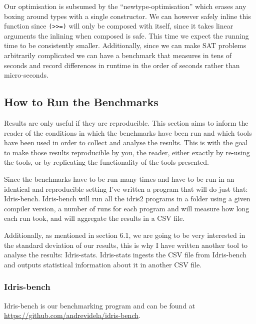 \documentclass[
]{article}
\begin{document}
Our optimisation is subsumed by the ``newtype-optimisation'' which
erases any boxing around types with a single constructor. We can however
safely inline this function since
\texttt{(\textgreater{}\textgreater{}=)} will only be composed with
itself, since it takes linear arguments the inlining when composed is
safe. This time we expect the running time to be consistently smaller.
Additionally, since we can make SAT problems arbitrarily complicated we
can have a benchmark that measures in tens of seconds and record
differences in runtime in the order of seconds rather than
micro-seconds.

\hypertarget{how-to-run-the-benchmarks}{%
\subsection{How to Run the Benchmarks}\label{how-to-run-the-benchmarks}}

Results are only useful if they are reproducible. This section aims to
inform the reader of the conditions in which the benchmarks have been
run and which tools have been used in order to collect and analyse the
results. This is with the goal to make those results reproducible by
you, the reader, either exactly by re-using the tools, or by replicating
the functionality of the tools presented.

Since the benchmarks have to be run many times and have to be run in an
identical and reproducible setting I've written a program that will do
just that: Idris-bench. Idris-bench will run all the idris2 programs in
a folder using a given compiler version, a number of runs for each
program and will measure how long each run took, and will aggregate the
results in a CSV file.

Additionally, as mentioned in section 6.1, we are going to be very
interested in the standard deviation of our results, this is why I have
written another tool to analyse the results: Idris-stats. Idris-stats
ingests the CSV file from Idris-bench and outputs statistical
information about it in another CSV file.

\hypertarget{idris-bench}{%
\subsubsection{Idris-bench}\label{idris-bench}}

Idris-bench is our benchmarking program and can be found at
\protect\hyperlink{}{https://github.com/andrevidela/idris-bench}.
\end{document}
